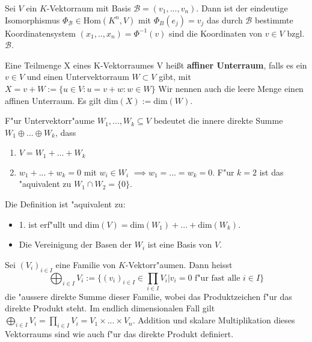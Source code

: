 \documentclass[8pt, a4paper, twocolumn, landscape]{article}
\begin{document}
\begin{definition}
Sei $V$ ein $K$-Vektorraum mit  Basis $\mathcal{B} = (v_1, ..., v_n)$.
Dann ist der eindeutige Isomorphismus $\Phi_\mathcal{B} \in \mathrm{Hom}(K^n, V)$ mit $ \Phi_B (e_j) = v_j $ das durch $\mathcal{B}$ bestimmte Koordinatensystem $(x_1, .., x_n) = \Phi^{-1}(v)$ sind die Koordinaten von $v \in V$ bzgl. $\mathcal{B}$.
\end{definition}

\begin{definition}
Eine Teilmenge X eines K-Vektorraumes V heißt \textbf{affiner Unterraum}, falls es ein $v \in V$ und einen Untervektorraum $W \subset V$ gibt, mit
$X = v + W := \{u \in V: u = v + w: w \in W\}$ 
Wir nennen auch die leere Menge einen affinen Unterraum.
Es gilt $\mathrm{dim}(X)  := \mathrm{dim}(W)$.
\end{definition}

\begin{definition} 
F"ur Untervektorr"aume $W_1, ..., W_k \subseteq V$ bedeutet die innere direkte Summe $W_1 \oplus ... \oplus W_k$, dass 
\begin{enumerate}
\item $V = W_1 + ... + W_k$
\item $w_1 + ... + w_k = 0$ mit $w_i \in W_i$ $\implies w_1 = ... = w_k = 0$. F"ur $k = 2$ ist das "aquivalent zu $W_1 \cap W_2 = \{0\}$.
\end{enumerate}
Die Definition ist "aquivalent zu:
\begin{itemize}
\item 1. ist erf"ullt und $\mathrm{dim}(V) = \mathrm{dim}(W_1) + ... + \mathrm{dim}(W_k)$.
\item Die Vereinigung der Basen der $W_i$ ist eine Basis von $V$.
\end{itemize}
\end{definition}

\begin{definition}
Sei $(V_i)_{i \in I}$ eine Familie von $K$-Vektorr"aumen. Dann heisst 
$$
\bigoplus_{ i \in I} V_i := \{(v_i)_{i\in I} \in \prod_{i \in I} V_i | v_i = 0 \text{ f"ur fast alle } i \in I \}
$$
die "aussere direkte Summe dieser Familie, wobei das Produktzeichen f"ur das direkte Produkt steht. Im endlich dimensionalen Fall gilt $\bigoplus_{ i \in I} V_i =  \prod_{i \in I} V_i  = V_1 \times ... \times V_n$. Addition und skalare Multiplikation dieses Vektorraums sind wie auch f"ur das direkte Produkt definiert.
\end{definition}
\end{document}
